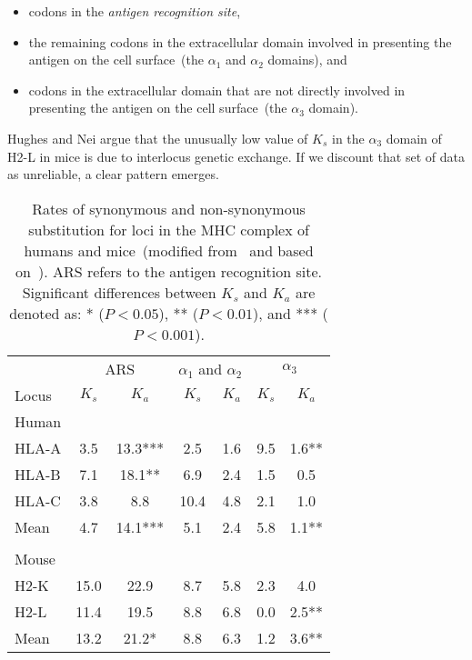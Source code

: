 \documentclass[12pt]{article}
\begin{document}
\begin{itemize}

\item codons in the {\it antigen recognition site},

\item the remaining codons in the extracellular domain involved in
  presenting the antigen on the cell surface~(the $\alpha_1$ and
  $\alpha_2$ domains), and

\item codons in the extracellular domain that are not directly
  involved in presenting the antigen on the cell surface~(the
  $\alpha_3$ domain).

\end{itemize}
Hughes and Nei argue that the unusually low value of $K_s$ in the
$\alpha_3$ domain of H2-L in mice is due to interlocus genetic
exchange. If we discount that set of data as unreliable, a clear
pattern emerges.

\begin{table}
\begin{center}
\begin{tabular}{lcccccc}
\hline\hline
      & \multicolumn{2}{c}{ARS} 
      & \multicolumn{2}{c}{$\alpha_1$ and $\alpha_2$}
      & \multicolumn{2}{c}{$\alpha_3$} \\
Locus & $K_s$ & $K_a$ & $K_s$ & $K_a$ & $K_s$ & $K_a$ \\
\hline
Human \\
\quad HLA-A & 3.5 & 13.3*** &  2.5 & 1.6 & 9.5 & 1.6** \\
\quad HLA-B & 7.1 & 18.1**  &  6.9 & 2.4 & 1.5 & 0.5 \\
\quad HLA-C & 3.8 &  8.8    & 10.4 & 4.8 & 2.1 & 1.0 \\
Mean        & 4.7 & 14.1*** &  5.1 & 2.4 & 5.8 & 1.1** \\
\\
Mouse \\
\quad H2-K  & 15.0 & 22.9   &  8.7 & 5.8 & 2.3 & 4.0 \\
\quad H2-L  & 11.4 & 19.5   &  8.8 & 6.8 & 0.0 & 2.5** \\
Mean        & 13.2 & 21.2*  &  8.8 & 6.3 & 1.2 & 3.6** \\
\hline
\end{tabular}
\end{center}
\caption{Rates of synonymous and non-synonymous substitution for loci
  in the MHC complex of humans and mice~(modified from~\cite{Li97} and
  based on~\cite{Hughes-Nei88}). ARS refers to the antigen recognition
  site. Significant differences between $K_s$ and $K_a$ are denoted
  as: * ($P < 0.05$), ** ($P < 0.01$), and *** ($P <
  0.001$).}\label{table:hughes-nei}
\end{table}
\end{document}
